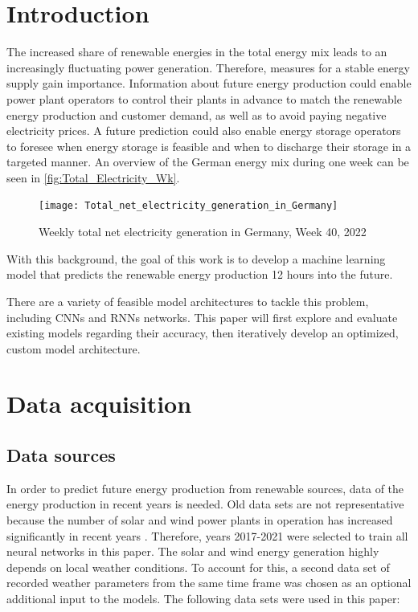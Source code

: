 \documentclass[11pt,table]{article}
\begin{document}
\section{Introduction}

The increased share of renewable energies in the total energy mix leads to an increasingly fluctuating power generation. Therefore, measures for a stable energy supply gain importance. Information about future energy production could enable power plant operators to control their plants in advance to match the renewable energy production and customer demand, as well as to avoid paying negative electricity prices. A future prediction could also enable energy storage operators to foresee when energy storage is feasible and when to discharge their storage in a targeted manner. An overview of the German energy mix during one week can be seen in \autoref{fig:Total_Electricity_Wk}.

\begin{figure}[ht]
	\centering
	\texttt{[image: Total\_net\_electricity\_generation\_in\_Germany]}
	\caption{Weekly total net electricity generation in Germany, Week 40, 2022 \cite{energy_charts_stromproduktion}}
	\label{fig:Total_Electricity_Wk}
\end{figure}

With this background, the goal of this work is to develop a machine learning model that predicts the renewable energy production 12 hours into the future.

There are a variety of feasible model architectures to tackle this problem, including \acp{CNN} and \acp{RNN} networks. This paper will first explore and evaluate existing models regarding their accuracy, then iteratively develop an optimized, custom model architecture.

\section{Data acquisition}
\subsection{Data sources}
In order to predict future energy production from renewable sources, data of the energy production in recent years is needed. Old data sets are not representative because the number of solar and wind power plants in operation has increased significantly in recent years \cite{statistaSolarPower, statistaWindPower}. Therefore, years 2017-2021 were selected to train all neural networks in this paper. The solar and wind energy generation highly depends on local weather conditions. To account for this, a second data set of recorded weather parameters from the same time frame was chosen as an optional additional input to the models.
The following data sets were used in this paper:
\end{document}
